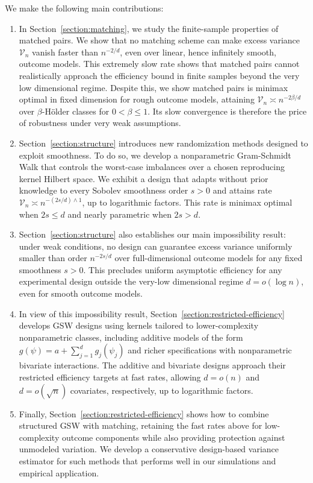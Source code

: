 \documentclass[letterpaper,12pt]{article}
\theoremstyle{definition}
\numberwithin{equation}{section}
\newcommand{\mc}{\mathcal}
\begin{document}
We make the following main contributions: 
\begin{enumerate}
	\item In Section~\ref{section:matching}, we study the finite-sample properties of matched pairs.
	We show that no matching scheme can make excess variance $\mc V_n$ vanish faster than $n^{-2/d}$, even over linear, hence infinitely smooth, outcome models.
	This extremely slow rate shows that matched pairs cannot realistically approach the efficiency bound in finite samples beyond the very low dimensional regime. 
	Despite this, we show matched pairs is minimax optimal in fixed dimension for rough outcome models, attaining $\mc V_n\asymp n^{-2\beta/d}$ over $\beta$-H\"older classes for $0<\beta\leq1$.
	Its slow convergence is therefore the price of robustness under very weak assumptions.

	\item Section~\ref{section:structure} introduces new randomization methods designed to exploit smoothness. 
	To do so, we develop a nonparametric Gram-Schmidt Walk that controls the worst-case imbalances over a chosen reproducing kernel Hilbert space.
	We exhibit a design that adapts without prior knowledge to every Sobolev smoothness order $s>0$ and attains rate $\mc V_n \asymp n^{-(2s/d)\wedge1}$, up to logarithmic factors. 
	This rate is minimax optimal when $2s\leq d$ and nearly parametric when $2s>d$.

	\item Section~\ref{section:structure} also establishes our main impossibility result: under weak conditions, no design can guarantee excess variance uniformly smaller than order $n^{-2s/d}$ over full-dimensional outcome models for any fixed smoothness $s>0$.
	This precludes uniform asymptotic efficiency for any experimental design outside the very-low dimensional regime $d=o(\log n)$, even for smooth outcome models.

	\item In view of this impossibility result, Section~\ref{section:restricted-efficiency} develops GSW designs using kernels tailored to lower-complexity nonparametric classes, including additive models of the form $g(\psi)=a+\sum_{j=1}^d g_j(\psi_j)$ and richer specifications with nonparametric bivariate interactions.
	The additive and bivariate designs approach their restricted efficiency targets at fast rates, allowing $d=o(n)$ and $d=o(\sqrt n)$ covariates, respectively, up to logarithmic factors.

	\item Finally, Section~\ref{section:restricted-efficiency} shows how to combine structured GSW with matching, retaining the fast rates above for low-complexity outcome components while also providing protection against unmodeled variation.
	We develop a conservative design-based variance estimator for such methods that performs well in our simulations and empirical application.
\end{enumerate}
\end{document}
